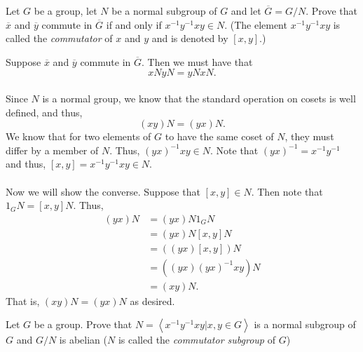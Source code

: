 \documentclass[12 pt, letterpaper]{hmcpset}
\begin{document}
\begin{problem}
	Let $G$ be a group, let $N$ be a normal subgroup of $G$ and let $\overline{G} = G/N$. Prove that $\overline{x}$ and $\overline{y}$ commute in $\overline{G}$ if and only if $x^{-1}y^{-1}xy \in N$. (The element $x^{-1}y^{-1}xy$ is called the \textit{commutator} of $x$ and $y$ and is denoted by $[x, y]$.)
\end{problem}

\begin{solution}
	Suppose $\overline{x}$ and $\overline{y}$ commute in $\overline{G}$. Then we must have that
	\[
		x N y N = y N x N.
	\] \\
	Since $N$ is a normal group, we know that the standard operation on cosets is well defined, and thus,
	\[
		(xy) N = (yx) N.
	\]
	We know that for two elements of $G$ to have the same coset of $N$, they must differ by a member of $N$. Thus, $(yx)^{-1}xy \in N$. Note that $(yx)^{-1} = x^{-1} y^{-1}$ and thus, $[x, y] = x^{-1}y^{-1}xy \in N$. \\\\
	Now we will show the converse. Suppose that $[x, y] \in N$. Then note that $1_{G} N = [x, y] N$. Thus,
	\[
		\begin{split}
			(yx) N & = (yx) N 1_{G} N \\
			       & = (yx) N [x, y] N \\
			       & = ((yx)[x, y]) N \\
			       & = ((yx)(yx)^{-1}xy) N \\
			       & = (xy) N.
		\end{split}
	\]
	That is, $(xy) N = (yx) N$ as desired.
\end{solution}

\pagebreak

\begin{problem}
	Let $G$ be a group. Prove that $N = \left < x^{-1}y^{-1}xy | x, y \in G \right >$ is a normal subgroup of $G$ and $G/N$ is abelian ($N$ is called the \textit{commutator subgroup} of $G$)
\end{problem}
\end{document}
